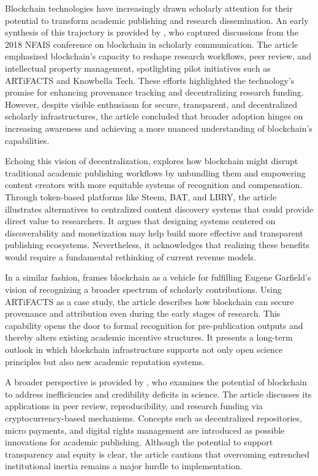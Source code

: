 \documentclass[final]{rc-book-2.14}
\begin{document}
Blockchain technologies have increasingly drawn scholarly attention for their potential to transform academic publishing and research dissemination. An early synthesis of this trajectory is provided by \cite{lawlor_overview_2018}, who captured discussions from the 2018 NFAIS conference on blockchain in scholarly communication. The article emphasized blockchain’s capacity to reshape research workflows, peer review, and intellectual property management, spotlighting pilot initiatives such as ARTiFACTS and Knowbella Tech. These efforts highlighted the technology’s promise for enhancing provenance tracking and decentralizing research funding. However, despite visible enthusiasm for secure, transparent, and decentralized scholarly infrastructures, the article concluded that broader adoption hinges on increasing awareness and achieving a more nuanced understanding of blockchain’s capabilities.

Echoing this vision of decentralization, \cite{holmen_blockchain_2018} explores how blockchain might disrupt traditional academic publishing workflows by unbundling them and empowering content creators with more equitable systems of recognition and compensation. Through token-based platforms like Steem, BAT, and LBRY, the article illustrates alternatives to centralized content discovery systems that could provide direct value to researchers. It argues that designing systems centered on discoverability and monetization may help build more effective and transparent publishing ecosystems. Nevertheless, it acknowledges that realizing these benefits would require a fundamental rethinking of current revenue models.

In a similar fashion, \cite{kochalko_making_2019} frames blockchain as a vehicle for fulfilling Eugene Garfield’s vision of recognizing a broader spectrum of scholarly contributions. Using ARTiFACTS as a case study, the article describes how blockchain can secure provenance and attribution even during the early stages of research. This capability opens the door to formal recognition for pre-publication outputs and thereby alters existing academic incentive structures. It presents a long-term outlook in which blockchain infrastructure supports not only open science principles but also new academic reputation systems.

A broader perspective is provided by \cite{van_rossum_blockchain_2018}, who examines the potential of blockchain to address inefficiencies and credibility deficits in science. The article discusses its applications in peer review, reproducibility, and research funding via cryptocurrency-based mechanisms. Concepts such as decentralized repositories, micro payments, and digital rights management are introduced as possible innovations for academic publishing. Although the potential to support transparency and equity is clear, the article cautions that overcoming entrenched institutional inertia remains a major hurdle to implementation.
\end{document}
